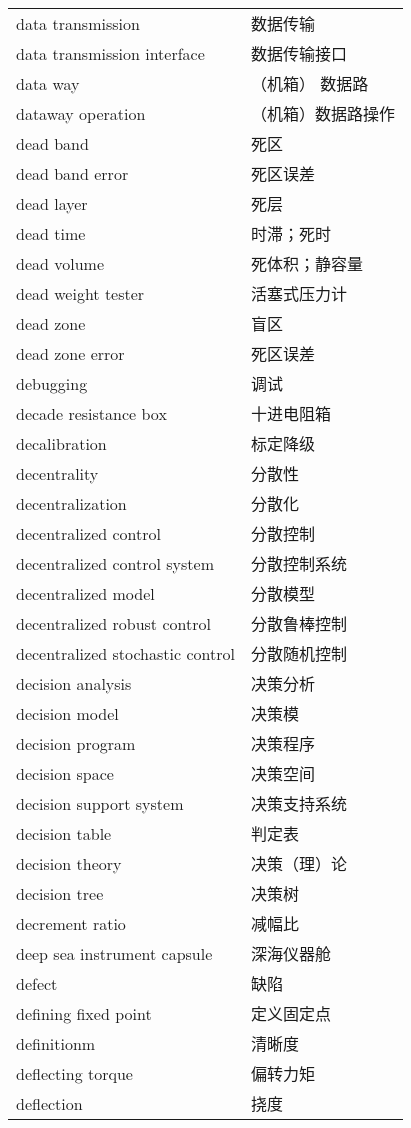\documentclass[
]{article}
\begin{document}
\begin{longtable}[]{@{}ll@{}}
data transmission & 数据传输 \\
data transmission interface & 数据传输接口 \\
data way & （机箱） 数据路 \\
dataway operation & （机箱）数据路操作 \\
dead band & 死区 \\
dead band error & 死区误差 \\
dead layer & 死层 \\
dead time & 时滞；死时 \\
dead volume & 死体积；静容量 \\
dead weight tester & 活塞式压力计 \\
dead zone & 盲区 \\
dead zone error & 死区误差 \\
debugging & 调试 \\
decade resistance box & 十进电阻箱 \\
decalibration & 标定降级 \\
decentrality & 分散性 \\
decentralization & 分散化 \\
decentralized control & 分散控制 \\
decentralized control system & 分散控制系统 \\
decentralized model & 分散模型 \\
decentralized robust control & 分散鲁棒控制 \\
decentralized stochastic control & 分散随机控制 \\
decision analysis & 决策分析 \\
decision model & 决策模 \\
decision program & 决策程序 \\
decision space & 决策空间 \\
decision support system & 决策支持系统 \\
decision table & 判定表 \\
decision theory & 决策（理）论 \\
decision tree & 决策树 \\
decrement ratio & 减幅比 \\
deep sea instrument capsule & 深海仪器舱 \\
defect & 缺陷 \\
defining fixed point & 定义固定点 \\
definitionm & 清晰度 \\
deflecting torque & 偏转力矩 \\
deflection & 挠度 \\

\end{longtable}
\end{document}
